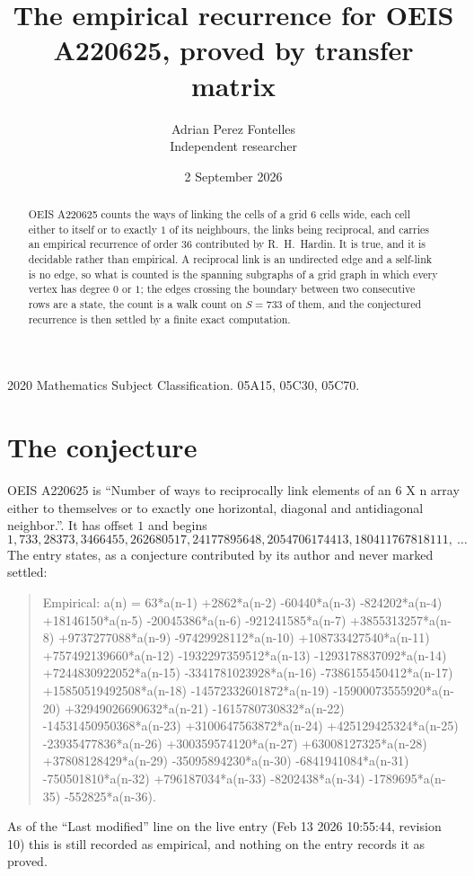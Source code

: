 \documentclass[11pt,a4paper]{article}
\title{The empirical recurrence for OEIS A220625, proved by transfer matrix}
\author{Adrian Perez Fontelles\\ \small Independent researcher}
\date{2 September 2026}
\theoremstyle{plain}
\theoremstyle{definition}
\begin{document}
\maketitle

\begin{abstract}
OEIS A220625 counts the ways of linking the cells of a grid $6$ cells wide, each cell either to
itself or to exactly $1$ of its neighbours, the links being reciprocal, and carries an
empirical recurrence of order $36$ contributed by R.~H.~Hardin. It is true, and it is
decidable rather than empirical. A reciprocal link is an undirected edge and a self-link is
no edge, so what is counted is the spanning subgraphs of a grid graph in which every vertex
has degree $0$ or $1$; the edges crossing the boundary between two consecutive rows are a
state, the count is a walk count on $S=733$ of them, and the conjectured recurrence is then
settled by a finite exact computation.
\end{abstract}

\noindent\small 2020 Mathematics Subject Classification. 05A15, 05C30, 05C70.\normalsize

\section{The conjecture}

OEIS A220625 is ``Number of ways to reciprocally link elements of an 6 X n array either to themselves or to exactly one horizontal, diagonal and antidiagonal neighbor.''. It has offset $1$ and begins
\[
1, 733, 28373, 3466455, 262680517, 24177895648, 2054706174413, 180411767818111,\ \dots
\]
The entry states, as a conjecture contributed by its author and never marked settled:
\begin{quote}
Empirical: a(n) = 63*a(n-1) +2862*a(n-2) -60440*a(n-3) -824202*a(n-4) +18146150*a(n-5) -20045386*a(n-6) -921241585*a(n-7) +3855313257*a(n-8) +9737277088*a(n-9) -97429928112*a(n-10) +108733427540*a(n-11) +757492139660*a(n-12) -1932297359512*a(n-13) -1293178837092*a(n-14) +7244830922052*a(n-15) -3341781023928*a(n-16) -7386155450412*a(n-17) +15850519492508*a(n-18) -14572332601872*a(n-19) -15900073555920*a(n-20) +32949026690632*a(n-21) -1615780730832*a(n-22) -14531450950368*a(n-23) +3100647563872*a(n-24) +425129425324*a(n-25) -23935477836*a(n-26) +300359574120*a(n-27) +63008127325*a(n-28) +37808128429*a(n-29) -35095894230*a(n-30) -6841941084*a(n-31) -750501810*a(n-32) +796187034*a(n-33) -8202438*a(n-34) -1789695*a(n-35) -552825*a(n-36).
\end{quote}
As of the ``Last modified'' line on the live entry (Feb 13 2026 10:55:44, revision 10) this is still
recorded as empirical, and nothing on the entry records it as proved.
\end{document}
